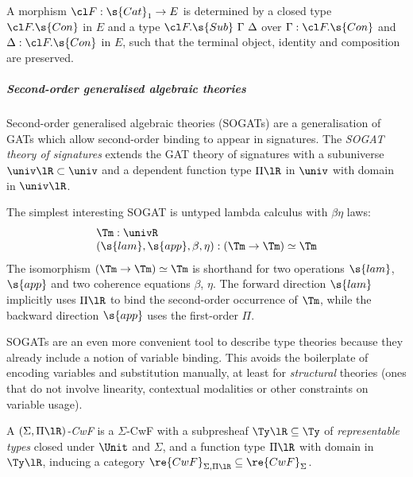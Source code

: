 \begin{example}
A morphism $\cl F : \s{Cat}_1 \to E$ is determined by a closed type $\cl
F.\s{Con}$ in $E$ and a type $\cl F.\s{Sub}\ \Gamma\ \Delta$ over $\Gamma : \cl
F.\s{Con}$ and $\Delta : \cl F.\s{Con}$ in $E$, such that the terminal object,
identity and composition are preserved.
\end{example}

\subparagraph{Second-order generalised algebraic theories}

Second-order generalised algebraic theories (SOGATs) \cite{Uemura2021-jq,Bocquet2025-ox} are a generalisation of
GATs which allow second-order binding to appear in signatures. The \emph{SOGAT
theory of signatures} extends the GAT theory of signatures with a subuniverse
$\univ\lR \subset \univ$ and a dependent function type $\Pi\lR$ in $\univ$ with
domain in $\univ\lR$.

\begin{example}
The simplest interesting SOGAT is untyped lambda calculus with $\beta\eta$ laws:
\begin{equation}\label{eq:lc-sogat}\begin{array}{l}
  \Tm : \univR \\
  (\s{lam}, \s{app}, \beta, \eta) : (\Tm \to \Tm) \simeq \Tm \end{array}
\end{equation}
The isomorphism $(\Tm \to \Tm) \simeq \Tm$ is shorthand for two operations
$\s{lam}$, $\s{app}$ and two coherence equations $\beta$, $\eta$. The forward
direction $\s{lam}$ implicitly uses $\Pi\lR$ to bind the second-order occurrence
of $\Tm$, while the backward direction $\s{app}$ uses the first-order $\Pi$.
\end{example}

SOGATs are an even more convenient tool to describe type theories because they
already include a notion of variable binding. This avoids the boilerplate of
encoding variables and substitution manually, at least for \emph{structural}
theories (ones that do not involve linearity, contextual modalities or other
constraints on variable usage).

\begin{definition}
A \emph{$(\Sigma, \Pi\lR)$-CwF}\label{def:sigma-pir-cwf} is a $\Sigma$-CwF
  with a subpresheaf $\Ty\lR \subseteq \Ty$ of \emph{representable types}
  closed under $\Unit$ and $\Sigma$, and a function type $\Pi\lR$ with domain
  in $\Ty\lR$, inducing a category $\re{CwF}_{\Sigma, \Pi\lR} \subseteq
  \re{CwF}_\Sigma$.
\end{definition} 


